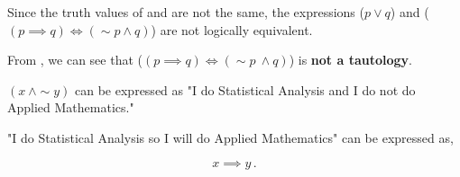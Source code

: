 \begin{subquestions}
\begin{subsubquestions}

\subsubquestion

\begin{subsubsubquestions}
	
\subsubsubquestion

Since the truth values of  and  are not the same, the expressions ($p \lor q$) and ($(p \implies q) \iff (\sim p \land q)$) are not logically equivalent.


\subsubsubquestion

From , we can see that ($(p \implies q) \iff (\sim p ~\land q)$) is \textbf{not a tautology}.

\end{subsubsubquestions}

\end{subsubquestions}


\subquestion

\begin{subsubquestions}
	
\subsubquestion

$(x ~\land \sim y)$ can be expressed as "I do Statistical Analysis and I do not do Applied Mathematics."

\subsubquestion

"I do Statistical Analysis so I will do Applied Mathematics" can be expressed as,

\begin{equation}
	x \implies y\,.
\end{equation}

\end{subsubquestions}



\end{subquestions}
